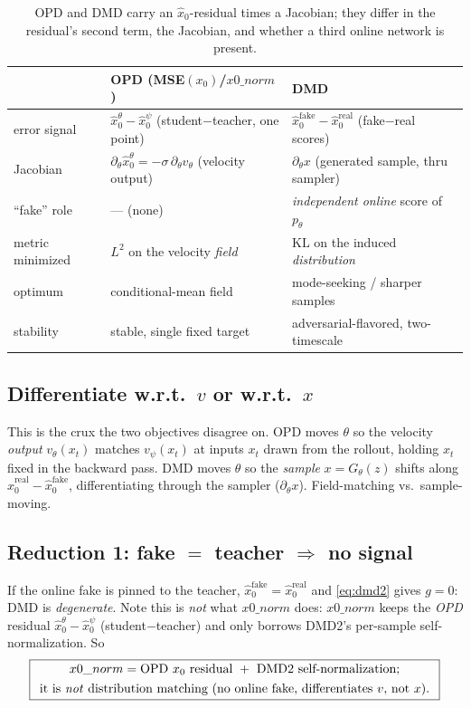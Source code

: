 \documentclass[11pt,a4paper]{article}
\newcommand{\KL}{\mathrm{KL}}
\newcommand{\xh}{\hat{x}_0}
\newcommand{\real}{\mathrm{real}}
\newcommand{\fake}{\mathrm{fake}}
\begin{document}
\begin{table}[ht]\centering\small
\begin{tabular}{@{}lll@{}}
\toprule
& \textbf{OPD} (MSE$(x_0)$/$x0\_norm$) & \textbf{DMD} \\
\midrule
error signal & $\xh^\theta-\xh^\psi$ (student$-$teacher, one point) & $\xh^{\fake}-\xh^{\real}$ (fake$-$real scores)\\
Jacobian & $\partial_\theta \xh^\theta=-\sigma\,\partial_\theta v_\theta$ (velocity output) & $\partial_\theta x$ (generated sample, thru sampler)\\
``fake'' role & --- (none) & \emph{independent online} score of $p_\theta$\\
metric minimized & $L^2$ on the velocity \emph{field} & $\KL$ on the induced \emph{distribution}\\
optimum & conditional-mean field & mode-seeking / sharper samples\\
stability & stable, single fixed target & adversarial-flavored, two-timescale\\
\bottomrule
\end{tabular}
\caption{OPD and DMD carry an $\xh$-residual times a Jacobian; they differ in the residual's second
term, the Jacobian, and whether a third online network is present.}
\label{tab:cmp}
\end{table}

\subsection[Differentiate with respect to v or x]
{Differentiate w.r.t.\ $v$ or w.r.t.\ $x$}
This is the crux the two objectives disagree on. OPD moves $\theta$ so the velocity \emph{output}
$v_\theta(x_t)$ matches $v_\psi(x_t)$ at inputs $x_t$ drawn from the rollout, holding $x_t$ fixed in
the backward pass. DMD moves $\theta$ so the \emph{sample} $x=G_\theta(z)$ shifts along
$\xh^{\real}-\xh^{\fake}$, differentiating through the sampler ($\partial_\theta x$). Field-matching
vs.\ sample-moving.

\subsection[Reduction 1: fake equals teacher]
{Reduction 1: fake $=$ teacher $\Rightarrow$ no signal}
If the online fake is pinned to the teacher, $\xh^{\fake}=\xh^{\real}$ and \eqref{eq:dmd2} gives
$g=0$: DMD is \emph{degenerate}. Note this is \emph{not} what $x0\_norm$ does: $x0\_norm$ keeps the
\emph{OPD} residual $\xh^\theta-\xh^\psi$ (student$-$teacher) and only borrows DMD2's per-sample
self-normalization. So
\begin{equation*}
\boxed{\parbox{0.92\linewidth}{\centering
$x0\_norm=\text{OPD }x_0\text{ residual }+\text{ DMD2 self-normalization}$;\\[0.35em]
it is \emph{not} distribution matching (no online fake, differentiates $v$, not $x$).}}
\end{equation*}
\end{document}

